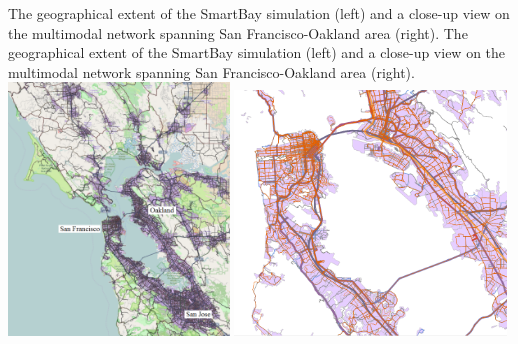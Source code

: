 \createfigure%
{The geographical extent of the SmartBay simulation (left) and a close-up view on the \gls{multimodal} network spanning San Francisco-Oakland area (right).}%
{The geographical extent of the SmartBay simulation (left) and a close-up view on the \gls{multimodal} network spanning San Francisco-Oakland area (right).}%
{\label{fig:sf1}}%
{%
 \createsubfigure%
 {}
 {\includegraphics[width=0.44\textwidth, angle=0]{./scenarios/figures/sf_fig1_left.png}}
 {\label{fig:sf_fig1_left}}
\createsubfigure%
 {}
 {\includegraphics[width=0.54\textwidth, angle=0]{./scenarios/figures/sf_fig1_right.png}}
 {\label{fig:sf_fig1_right}}
}%
{}
